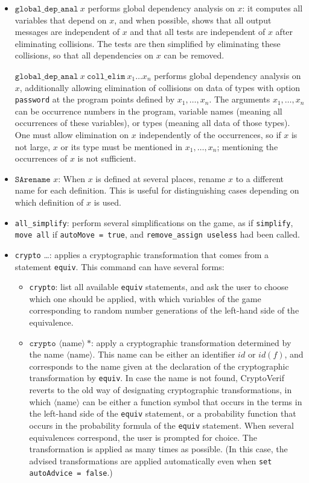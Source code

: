 \documentclass{article}
\newcommand{\nonterm}[1]{\langle\textrm{#1}\rangle}
\begin{document}
\begin{itemize}
\item $\texttt{global\_dep\_anal}\ x$ performs global dependency
  analysis on $x$: it computes all variables that depend on $x$, and
  when possible, shows that all output messages are independent of $x$
  and that all tests are independent of $x$ after eliminating
  collisions. The tests are then simplified by eliminating these
  collisions, so that all dependencies on $x$ can be removed.

$\texttt{global\_dep\_anal}\ x\ \texttt{coll\_elim}\ x_1 \ldots x_n$ 
performs global dependency analysis on $x$, 
additionally allowing elimination of collisions on data of types with
option \texttt{password} at the program points defined by $x_1, \ldots, x_n$.
The arguments $x_1, \ldots, x_n$ can be occurrence numbers in
the program, variable names (meaning all 
occurrences of these variables), or types (meaning all data of those types).
One must allow elimination on $x$ independently of the occurrences, 
so if $x$ is not large, $x$ or its type must be mentioned in $x_1, \ldots, x_n$;
mentioning the occurrences of $x$ is not sufficient.

\item $\texttt{SArename }x$: When $x$ is defined at several places,
rename $x$ to a different name for each definition. This is useful for
distinguishing cases depending on which definition of $x$ is used.

\item \texttt{all\string_simplify}: perform several simplifications 
on the game, as if \texttt{simplify}, \texttt{move all}
if \texttt{autoMove = true}, and \texttt{remove\string_assign useless}
had been called.

\item \texttt{crypto} \ldots: applies a cryptographic transformation
that comes from a statement \texttt{equiv}. This command can
have several forms:
\begin{itemize}

\item \texttt{crypto}: list all available \texttt{equiv} statements,
and ask the user to choose which one should be applied, 
with which variables of the game corresponding to random number generations
of the left-hand side of the equivalence.

\item $\texttt{crypto }\nonterm{name}\ \texttt{*}$: apply a cryptographic
transformation determined by the name $\nonterm{name}$. 
This name can be either an identifier $\mathit{id}$ or $\mathit{id}(f)$, 
and corresponds to the name given at the declaration of the 
cryptographic transformation by \texttt{equiv}.
In case the name is not found, CryptoVerif reverts to the
old way of designating cryptographic transformations, in which
$\nonterm{name}$ can be either a
function symbol that occurs in the terms in the left-hand side of the
\texttt{equiv} statement, or a probability function that occurs in the
probability formula of the \texttt{equiv} statement.
When several equivalences correspond, the user is prompted for choice.
The transformation is applied as many times as possible. (In this
case, the advised transformations are applied automatically even when
\texttt{set autoAdvice = false}.)


\end{itemize}
\end{itemize}
\end{document}
